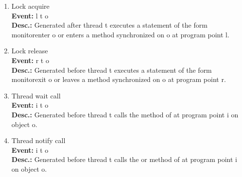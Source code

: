 \begin{enumerate}
\item
Lock acquire \\
{\bf Event:}  l t o \\
{\bf Desc.:} Generated after thread t executes a statement of the form monitorenter o or enters a method synchronized on o at program point l.

\item
Lock release \\
{\bf Event:}  r t o \\
{\bf Desc.:} Generated before thread t executes a statement of the form monitorexit o or leaves a method synchronized on o at program point r.

\item
Thread wait call \\
{\bf Event:}  i t o \\
{\bf Desc.:} Generated before thread t calls the  method of  at program point i on object o.

\item
Thread notify call \\
{\bf Event:}  i t o \\
{\bf Desc.:} Generated before thread t calls the  or  method of  at program point i on object o.
\end{enumerate}
